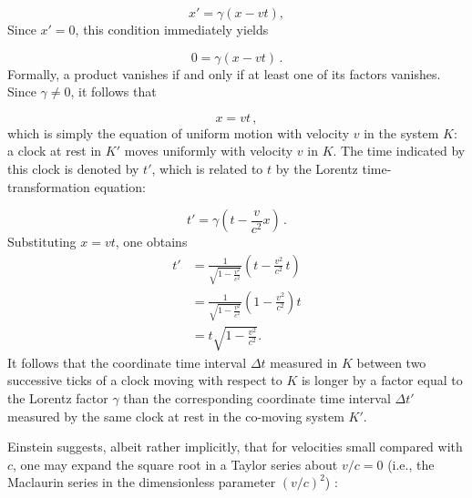 \documentclass[pdflatex,sn-basic]{sn-jnl}
\begin{document}
\begin{equation*}
x'=\gamma(x-vt),
\end{equation*}
%
Since $x'=0$, this condition immediately yields

\begin{equation*}
0=\gamma(x-vt)\,.
\end{equation*}
%
Formally, a product vanishes if and only if at least one of its factors vanishes. Since $\gamma \neq 0$, it follows that

\begin{equation*}
x=vt\,,
\end{equation*}
%
which is simply the equation of uniform motion with velocity $v$ in the system $K$: a clock at rest in $K'$ moves uniformly with velocity $v$ in $K$. The time indicated by this clock is denoted by $t'$, which is related to $t$ by the Lorentz time-transformation equation:

\begin{equation*}
t'=\gamma\!\left(t-\frac{v}{c^{2}}x\right)\,.
\end{equation*}
%
Substituting $x=vt$, one obtains
%
\begin{equation*}
\begin{aligned}
t'
&=\frac{1}{\sqrt{1-\frac{v^{2}}{c^{2}}}}
\left(t-\frac{v^{2}}{c^{2}}\,t\right)\\[6pt]
&=\frac{1}{\sqrt{1-\frac{v^{2}}{c^{2}}}}
\left(1-\frac{v^{2}}{c^{2}}\right)t\\[6pt]
&=t\sqrt{1-\frac{v^{2}}{c^{2}}}.
\end{aligned}
\end{equation*}%
%
It follows that the coordinate time interval $\Delta t$ measured in $K$ between two successive ticks of a clock moving with respect to $K$ is longer by a factor equal to the Lorentz factor $\gamma$ than the corresponding coordinate time interval $\Delta t'$ measured by the same clock at rest in the co-moving system $K'$.

Einstein suggests, albeit rather implicitly, that for velocities small compared with $c$, one may expand the square root in a Taylor series about $v/c=0$ (i.e., the Maclaurin series in the dimensionless parameter $(v/c)^{2}$)%
%
%
%
:
\end{document}
